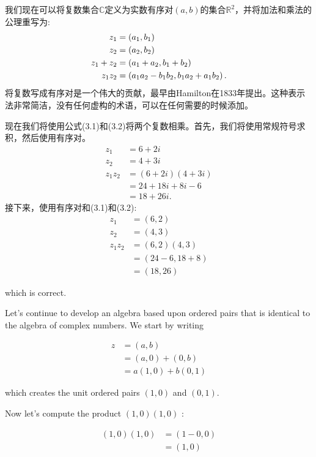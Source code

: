 我们现在可以将复数集合$\mathbb{C}$定义为实数有序对$(a, b)$的集合$\mathbb{R}^{2}$，并将加法和乘法的公理重写为:
\begin{align}
z_{1} & =\left(a_{1}, b_{1}\right) \notag\\
z_{2} & =\left(a_{2}, b_{2}\right) \notag\\
z_{1}+z_{2} & =\left(a_{1}+a_{2}, b_{1}+b_{2}\right) \label{Z.1}\\
z_{1} z_{2} & =\left(a_{1} a_{2}-b_{1} b_{2}, b_{1} a_{2}+a_{1} b_{2}\right) .\label{Z.2}
\end{align}
将复数写成有序对是一个伟大的贡献，最早由Hamilton在1833年提出。这种表示法非常简洁，没有任何虚构的术语，可以在任何需要的时候添加。

现在我们将使用公式(3.1)和(3.2)将两个复数相乘。首先，我们将使用常规符号求积，然后使用有序对。
$$
\begin{aligned}
z_{1} & =6+2 i \\
z_{2} & =4+3 i \\
z_{1} z_{2} & =(6+2 i)(4+3 i) \\
& =24+18 i+8 i-6 \\
& =18+26 i .
\end{aligned}
$$
接下来，使用有序对和(3.1)和(3.2):
$$
\begin{aligned}
z_{1} & =(6,2) \\
z_{2} & =(4,3) \\
z_{1} z_{2} & =(6,2)(4,3) \\
& =(24-6,18+8) \\
& =(18,26)
\end{aligned}
$$

which is correct.

Let's continue to develop an algebra based upon ordered pairs that is identical to the algebra of complex numbers. We start by writing

$$
\begin{aligned}
z & =(a, b) \\
& =(a, 0)+(0, b) \\
& =a(1,0)+b(0,1)
\end{aligned}
$$

which creates the unit ordered pairs $(1,0)$ and $(0,1)$.

Now let's compute the product $(1,0)(1,0)$ :

$$
\begin{aligned}
(1,0)(1,0) & =(1-0,0) \\
& =(1,0)
\end{aligned}
$$

